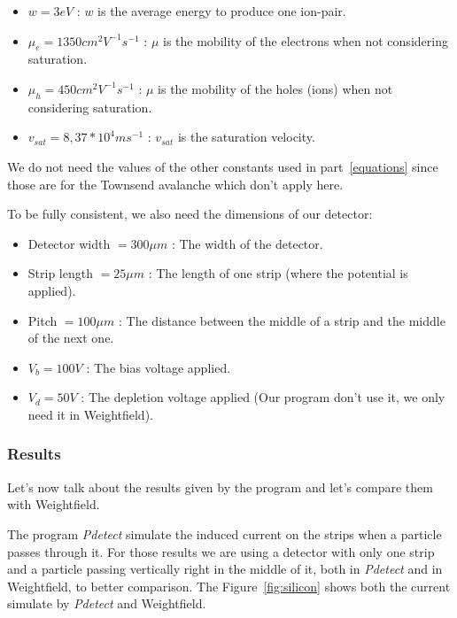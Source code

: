 \documentclass[11pt]{article}
\begin{document}
			\begin{itemize}

				\item $w = 3 eV$ : $w$ is the average energy to produce one ion-pair.
				\item $\mu_e = 1350 cm^2V^{-1}s^{-1}$ : $\mu$ is the mobility of the electrons
					when not considering saturation.
				\item $\mu_h = 450 cm^2V^{-1}s^{-1}$ : $\mu$ is the mobility of the holes (ions)
					when not considering saturation.
				\item $v_{sat} = 8,37*10^{4} ms^{-1}$ : $v_{sat}$ is the saturation velocity.

			\end{itemize}

			We do not need the values of the other constants used in part~\ref{equations} since
			those are for the Townsend avalanche which don't apply here.

			To be fully consistent, we also need the dimensions of our detector:

			\begin{itemize}

				\item Detector width $= 300 \mu m$ : The width of the detector.
				\item Strip length $= 25 \mu m$ : The length of one strip (where the potential is
					applied).
				\item Pitch $= 100 \mu m$ : The distance between the middle of a strip and the middle
					of the next one.
				\item $V_b = 100 V$ : The bias voltage applied.
				\item $V_d = 50 V$ : The depletion voltage applied (Our program don't use it, we only
					need it in Weightfield).

			\end{itemize}

		\subsubsection*{Results}

			Let's now talk about the results given by the program and let's compare them with Weightfield.

			The program \textit{Pdetect} simulate the induced current on the strips when a particle passes through it.
			For those results we are using a detector with only one strip and a particle passing vertically right in 
			the middle of it, both in \textit{Pdetect} and in Weightfield, to better comparison. The 
			Figure~\ref{fig:silicon} shows both the current simulate by \textit{Pdetect} and Weightfield.
\end{document}
